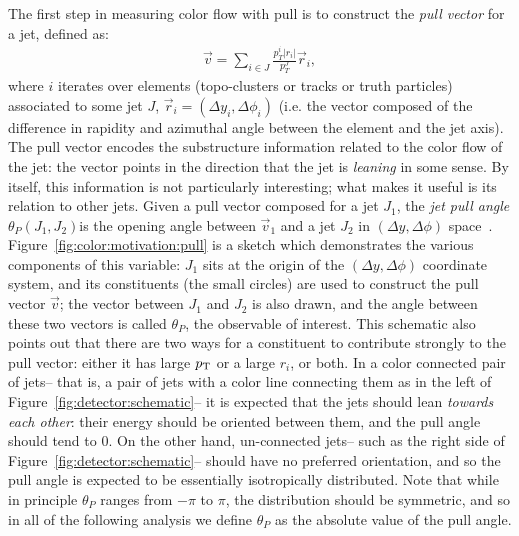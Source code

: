 The first step in measuring color flow with pull is to construct the \textit{pull vector} for a jet, defined as:
%
\begin{align}
\vec{v} = \sum_{i\in J} \frac{p_T^i |r_i|}{p_T^{J}}\vec{r}_i,
\end{align}
%
where $i$ iterates over elements (topo-clusters or tracks or truth particles) associated to some jet $J$, $\vec{r}_i = (\Delta y_i,\Delta\phi_i)$ (i.e. the vector composed of the difference in rapidity and azimuthal angle between the element and the jet axis). The pull vector encodes the substructure information related to the color flow of the jet: the vector points in the direction that the jet is \textit{leaning} in some sense. By itself, this information is not particularly interesting; what makes it useful is its relation to other jets. Given a pull vector composed for a jet $J_1$, the \textit{jet pull angle} $\theta_P(J_1, J_2)$is the opening angle between $\vec{v}_1$ and a jet $J_2$ in $(\Delta y,\Delta\phi)$ space~\cite{Gallicchio:2010sw}. Figure~\ref{fig:color:motivation:pull} is a sketch which demonstrates the various components of this variable: $J_1$ sits at the origin of the $(\Delta y,\Delta\phi)$ coordinate system, and its constituents (the small circles) are used to construct the pull vector $\vec{v}$; the vector between $J_1$ and $J_2$ is also drawn, and the angle between these two vectors is called $\theta_P$, the observable of interest. This schematic also points out that there are two ways for a constituent to contribute strongly to the pull vector: either it has large $p_{\text{T}}$ or a large $r_i$, or both. In a color connected pair of jets-- that is, a pair of jets with a color line connecting them as in the left of Figure~\ref{fig:detector:schematic}-- it is expected that the jets should lean \textit{towards each other}: their energy should be oriented between them, and the pull angle should tend to 0. On the other hand, un-connected jets-- such as the right side of Figure~\ref{fig:detector:schematic}-- should have no preferred orientation, and so the pull angle is expected to be essentially isotropically distributed. Note that while in principle $\theta_P$ ranges from $-\pi$ to $\pi$, the distribution should  be symmetric, and so in all of the following analysis we define $\theta_P$ as the absolute value of the pull angle.





